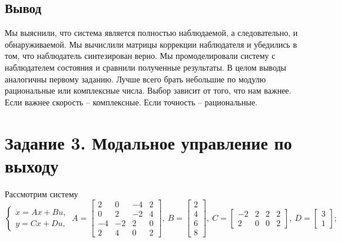 \documentclass[a4paper, 12pt]{article}
\begin{document}
    
    \subsection{Вывод}
    Мы выяснили, что система является полностью наблюдаемой, а следовательно, и обнаруживаемой.
    Мы вычислили матрицы коррекции наблюдателя и убедились в том, что наблюдатель синтезирован верно.
    Мы промоделировали систему с наблюдателем состояния и сравнили полученные результаты. В целом
    выводы аналогичны первому заданию. Лучше всего брать небольшие по модулю рациональные или комплексные числа.
    Выбор зависит от того, что нам важнее. Если важнее скорость -- комплексные. Если точность -- рациональные.


    \section{Задание 3. Модальное управление по выходу}
    Рассмотрим систему
    $$
    \begin{cases}
        \dot{x}=Ax+Bu,\\
        y=Cx+Du,
    \end{cases}\ A=\begin{bmatrix}
        2 &0 &-4 &2\\
        0 &2 &-2 &4\\
        -4 &-2 &2 &0\\
        2 &4 &0 &2
    \end{bmatrix},\ B=\begin{bmatrix}
        2\\
        4\\
        6\\
        8
    \end{bmatrix},\ C=\begin{bmatrix}
        -2 &2 &2 &2\\
        2 &0 &0 &2
    \end{bmatrix},\ D=\begin{bmatrix}
        3\\
        1
    \end{bmatrix};
    $$
\end{document}
